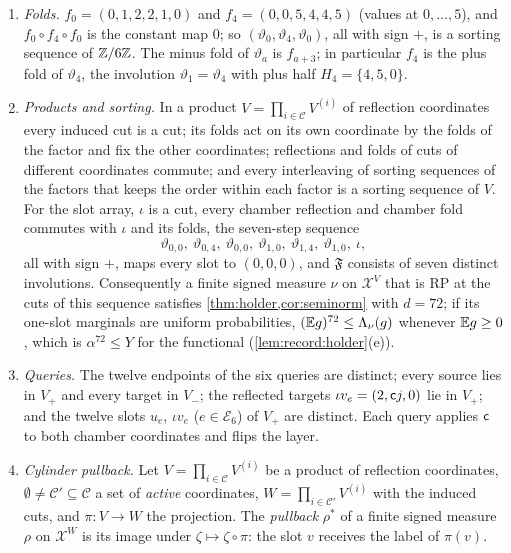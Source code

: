 \begin{lemma}
\begin{enumerate}[label=(\roman*)]
 at every cut of $\mathfrak F$.
\item \emph{Folds.} $f_0=(0,1,2,2,1,0)$ and $f_4=(0,0,5,4,4,5)$ (values at
 $0,\dots,5$), and $f_0\circ f_4\circ f_0$ is the constant map $0$; so
 $(\vartheta_0,\vartheta_4,\vartheta_0)$, all with sign $+$, is a sorting
 sequence of $\mathbb Z/6\mathbb Z$. The minus fold of $\vartheta_a$ is $f_{a+3}$; in
 particular $f_4$ is the plus fold of $\vartheta_4$, the involution
 $\vartheta_1=\vartheta_4$ with plus half $H_4=\{4,5,0\}$.
\item \emph{Products and sorting.} In a product $V=\prod_{i\in\mathcal C}V^{(i)}$
 of reflection coordinates every induced cut is a cut; its folds act on its
 own coordinate by the folds of the factor and fix the other coordinates;
 reflections and folds of cuts of different coordinates commute; and every
 interleaving of sorting sequences of the factors that keeps the order within
 each factor is a sorting sequence of $V$. For the slot array, $\iota$ is a
 cut, every chamber reflection and chamber fold commutes with $\iota$ and its
 folds, the seven-step sequence
 \[
  \vartheta_{0,0},\ \vartheta_{0,4},\ \vartheta_{0,0},\ \vartheta_{1,0},\
  \vartheta_{1,4},\ \vartheta_{1,0},\ \iota,
 \]
 all with sign $+$, maps every slot to $(0,0,0)$, and $\mathfrak F$ consists
 of seven distinct involutions. Consequently a finite signed measure $\nu$ on
 $\mathcal X^V$ that is RP at the cuts of this sequence satisfies
 \cref{thm:holder,cor:seminorm} with $d=72$; if its one-slot marginals are
 uniform probabilities, $(\mathbb E g)^{72}\le\Lambda_\nu(g)$ whenever $\mathbb E g\ge0$,
 which is $\alpha^{72}\le Y$ for the functional (\cref{lem:record:holder}(e)).
\item \emph{Queries.} The twelve endpoints of the six queries are distinct;
 every source lies in $V_+$ and every target in $V_-$; the reflected targets
 $\iota v_e=(2,\mathsf c j,0)$ lie in $V_+$; and the twelve slots $u_e$, $\iota v_e$
 ($e\in\mathcal E_6$) of $V_+$ are distinct. Each query applies $\mathsf c$ to both
 chamber coordinates and flips the layer.
\item \emph{Cylinder pullback.} Let $V=\prod_{i\in\mathcal C}V^{(i)}$ be a product
 of reflection coordinates, $\emptyset\ne\mathcal C'\subseteq\mathcal C$ a set
 of \emph{active} coordinates, $W=\prod_{i\in\mathcal C'}V^{(i)}$ with the
 induced cuts, and $\pi\colon V\to W$ the projection. The \emph{pullback}
 $\rho^*$ of a finite signed measure $\rho$ on $\mathcal X^W$ is its image under
 $\zeta\mapsto\zeta\circ\pi$: the slot $v$ receives the label of $\pi(v)$.
 \begin{enumerate}[label=(\alph*)]

\end{enumerate}
\end{enumerate}
\end{lemma}
